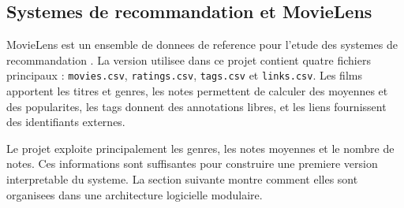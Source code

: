 \subsection{Systemes de recommandation et MovieLens}

MovieLens est un ensemble de donnees de reference pour l'etude des systemes de recommandation \cite{harper2015}. La version utilisee dans ce projet contient quatre fichiers principaux : \texttt{movies.csv}, \texttt{ratings.csv}, \texttt{tags.csv} et \texttt{links.csv}. Les films apportent les titres et genres, les notes permettent de calculer des moyennes et des popularites, les tags donnent des annotations libres, et les liens fournissent des identifiants externes.

Le projet exploite principalement les genres, les notes moyennes et le nombre de notes. Ces informations sont suffisantes pour construire une premiere version interpretable du systeme. La section suivante montre comment elles sont organisees dans une architecture logicielle modulaire.
